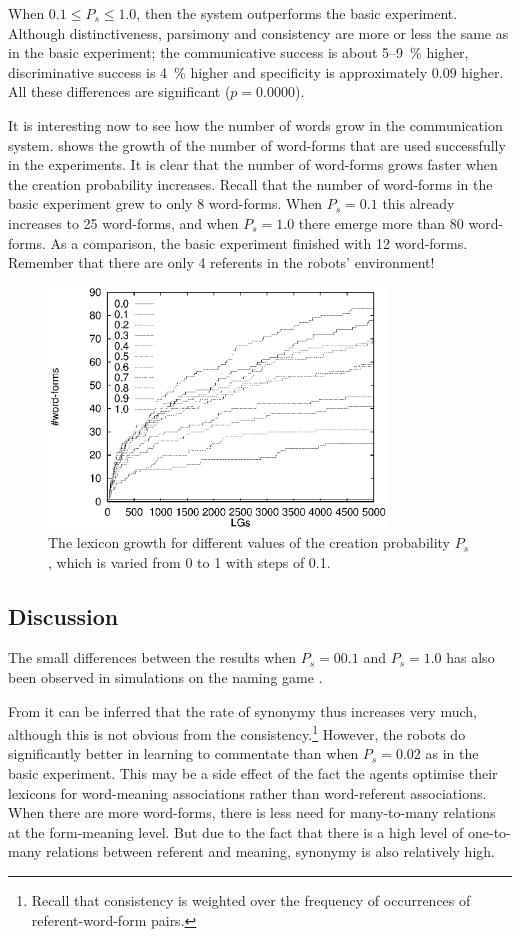 When $0.1 \leq P_s \leq 1.0$, then the system outperforms the basic experiment. Although distinctiveness, parsimony and consistency are more or less the same as in the basic experiment; the communicative success is about 5--9~\% higher, discriminative success is 4~\% higher and specificity is approximately 0.09 higher. All these differences are significant ($p=0.0000$).

It is interesting now to see how the number of words grow in the communication system.  shows the growth of the number of word-forms that are used successfully in the experiments. It is clear that the number of word-forms grows faster when the creation probability increases. Recall that the number of word-forms in the basic experiment grew to only 8 word-forms. When $P_s=0.1$ this already increases to 25 word-forms, and when $P_s=1.0$ there emerge more than 80 word-forms. As a comparison, the basic experiment finished with 12 word-forms. Remember that there are only 4 referents in the robots' environment!

\begin{figure}
	\centerline{\includegraphics[width=9cm]{lexicon/words.eps}}
	\caption{The lexicon growth for different values of the creation probability $P_s$, which is varied from 0 to 1 with steps of 0.1.}
	\label{f:lex:words}
\end{figure}

\subsection{Discussion}

The small differences between the results when $P_s=00.1$ and $P_s=1.0$ has also been observed in simulations on the naming game \citep{kaplan:2000}.

From  it can be inferred that the rate of synonymy thus increases very much, although this is not obvious from the consistency.\footnote{Recall that consistency is weighted over the frequency of occurrences of referent-word-form pairs.} However, the robots do significantly better in learning to commentate than when $P_s=0.02$ as in the basic experiment. This may be a side effect of the fact the agents optimise their lexicons for word-meaning associations rather than word-referent associations. When there are more word-forms, there is less need for many-to-many relations at the form-meaning level. But due to the fact that there is a high level of one-to-many relations between referent and meaning, synonymy is also relatively high.

